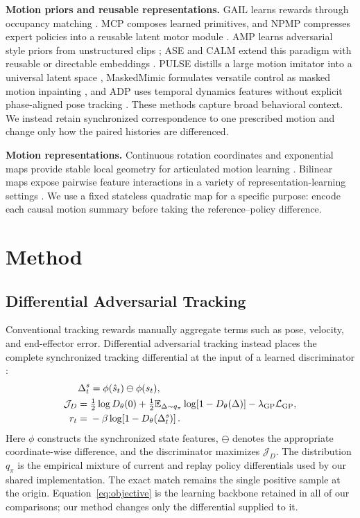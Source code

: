 \textbf{Motion priors and reusable representations.}
GAIL learns rewards through occupancy matching \cite{ho2016gail}.  MCP composes
learned primitives, and NPMP compresses expert policies into a reusable latent
motor module \cite{peng2019mcp,merel2019npmp}.  AMP learns adversarial style
priors from unstructured clips \cite{peng2021amp}; ASE and CALM extend this
paradigm with reusable or directable embeddings
\cite{peng2022ase,tessler2023calm}.  PULSE distills a large motion imitator into
a universal latent space \cite{luo2024pulse}, MaskedMimic formulates versatile
control as masked motion inpainting \cite{tessler2024maskedmimic}, and ADP uses
temporal dynamics features without explicit phase-aligned pose tracking
\cite{lee2026adp}.  These methods capture broad behavioral context.  We instead
retain synchronized correspondence to one prescribed motion and change only how the
paired histories are differenced.

\textbf{Motion representations.}
Continuous rotation coordinates and exponential maps provide stable local
geometry for articulated motion learning \cite{grassia1998rotations,
zhou2019continuity}.  Bilinear maps expose pairwise feature interactions in a
variety of representation-learning settings \cite{lin2015bilinear}.  We use a
fixed stateless quadratic map for a specific purpose: encode each causal
motion summary before taking the reference--policy difference.

\section{Method}
\label{sec:method}

\subsection{Differential Adversarial Tracking}

Conventional tracking rewards manually aggregate terms such as pose, velocity,
and end-effector error.  Differential adversarial tracking instead places the
complete synchronized tracking differential at the input of a learned
discriminator \cite{zhang2025add}:
\begin{equation}
 \begin{aligned}
 \Delta_t^s&=\phi(\hat s_t)\ominus\phi(s_t),\\
 \mathcal J_D={}&\tfrac12\log D_\theta(0)
 +\tfrac12\mathbb E_{\Delta\sim q_\pi}
   \log\!\left[1-D_\theta(\Delta)\right]
 -\lambda_{\rm GP}\mathcal L_{\rm GP},\\
 r_t={}&-\beta\log\!\left[1-D_\theta(\Delta_t^s)\right].
 \end{aligned}
 \label{eq:objective}
\end{equation}
Here $\phi$ constructs the synchronized state features, $\ominus$ denotes the
appropriate coordinate-wise difference, and the discriminator maximizes
$\mathcal J_D$.  The distribution $q_\pi$ is the empirical mixture of current
and replay policy differentials used by our shared implementation.  The exact
match remains the single positive sample at the origin.
Equation~\eqref{eq:objective} is the learning backbone retained in all of our
comparisons; our method changes only the differential supplied to it.

